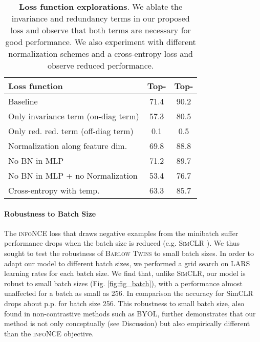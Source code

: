 \documentclass{article}
\newcommand{\AlgoName}{\textsc{Barlow Twins}}
\begin{document}
\begin{table}[ht]
\caption{\textbf{Loss function explorations}. We ablate the invariance and redundancy terms in our proposed loss and observe that both terms are necessary for good performance. We also experiment with different normalization schemes and a cross-entropy loss and observe reduced performance.}
\label{tab:abl-loss}
\vskip 0.15in
\begin{center}
\begin{tabular}{l c c}
\toprule
Loss function & Top- & Top- \\
\midrule
    Baseline & 71.4 & 90.2 \\
\midrule
    Only invariance term (on-diag term)  & 57.3 & 80.5 \\ 
    Only red. red. term (off-diag term)  & 0.1 & 0.5 \\
    \midrule
    Normalization along feature dim. & 69.8 & 88.8 \\
    No BN in MLP & 71.2 & 89.7 \\
    No BN in MLP + no Normalization & 53.4 & 76.7 \\
    \midrule
    Cross-entropy with temp. & 63.3 & 85.7 \\
\bottomrule
\end{tabular}
\end{center}
\vskip -0.1in
\end{table}

\paragraph{Robustness to Batch Size} 
The \textsc{infoNCE} loss that draws negative examples from the minibatch suffer performance drops when the batch size is reduced (e.g. \textsc{SimCLR} \cite{chen2020simple}).  We thus sought to test the robustness of \AlgoName{} to small batch sizes. In order to adapt our model to different batch sizes, we performed a grid search on LARS learning rates for each batch size. We find that, unlike \textsc{SimCLR}, our model is robust to small batch sizes (Fig. \ref{fig:fig_batch}), with a performance almost unaffected for a batch as small as 256. In comparison the accuracy for SimCLR drops about  p.p. for batch size 256. This robustness to small batch size, also found in non-contrastive methods such as \textsc{BYOL}, further demonstrates that our method is not only conceptually (see Discussion) but also empirically different than the \textsc{infoNCE} objective.
\end{document}
